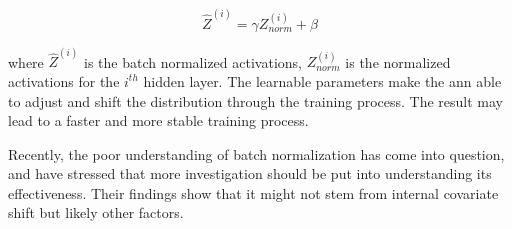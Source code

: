         \begin{equation} \label{batch_normalization}
            \hat{Z}^{(i)} =   \gamma Z^{(i)}_{norm} + \beta
        \end{equation}
    
    where $\hat{Z}^{(i)}$ is the batch normalized activations, $Z^{(i)}_{norm}$ is the normalized activations for the $i^{th}$ hidden layer. The learnable parameters make the \gls{ann} able to adjust and shift the distribution through the training process. The result may lead to a faster and more stable training process. 
    
    Recently, the poor understanding of batch normalization has come into question, and \citet{batch_norm_not_work} have stressed that more investigation should be put into understanding its effectiveness. Their findings show that it might not stem from internal covariate shift but likely other factors. 
\clearpage
